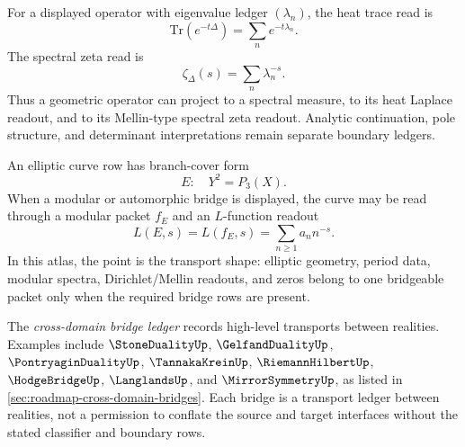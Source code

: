 \begin{definition}
\label{def:unified-reality-heat-spectral-zeta-row}
For a displayed operator with eigenvalue ledger $(\lambda_n)$, the heat
trace read is
$$
\mathrm{Tr}(e^{-t\Delta})
=
\sum_n e^{-t\lambda_n}.
$$
The spectral zeta read is
$$
\zeta_{\Delta}(s)
=
\sum_n\lambda_n^{-s}.
$$
Thus a geometric operator can project to a spectral measure, to its heat
Laplace readout, and to its Mellin-type spectral zeta readout. Analytic
continuation, pole structure, and determinant interpretations remain
separate boundary ledgers.
\end{definition}

\begin{definition}
\label{def:unified-reality-elliptic-modular-lfunction-row}
An elliptic curve row has branch-cover form
$$
E:\quad Y^2=P_3(X).
$$
When a modular or automorphic bridge is displayed, the curve may be read
through a modular packet $f_E$ and an $L$-function readout
$$
L(E,s)=L(f_E,s)=\sum_{n\ge1}a_n n^{-s}.
$$
In this atlas, the point is the transport shape: elliptic geometry,
period data, modular spectra, Dirichlet/Mellin readouts, and zeros
belong to one bridgeable packet only when the required bridge rows are
present.
\end{definition}

\begin{definition}
\label{def:unified-reality-cross-domain-bridge-ledger}
The \emph{cross-domain bridge ledger} records high-level transports
between realities. Examples include $\StoneDualityUp$,
$\GelfandDualityUp$, $\PontryaginDualityUp$, $\TannakaKreinUp$,
$\RiemannHilbertUp$, $\HodgeBridgeUp$, $\LanglandsUp$, and
$\MirrorSymmetryUp$, as listed in
\autoref{sec:roadmap-cross-domain-bridges}. Each bridge is a transport
ledger between realities, not a permission to conflate the source and
target interfaces without the stated classifier and boundary rows.
\end{definition}

